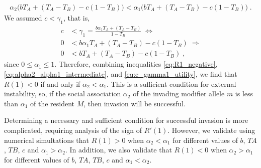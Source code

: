 \documentclass[12pt]{extarticle}
\begin{document}
\begin{appendices}
\begin{equation}
\begin{aligned}
\alpha_2 \big(b T_{A} + (T_A-T_B) - c(1-T_B)\big) <
\alpha_1 \big(b T_{A} + (T_A-T_B) - c(1-T_B)\big) \;.
\end{aligned}
\end{equation}
We assumed $c<\gamma_1$, that is,
\begin{equation} \label{eq:c_gamma1_utility}
\begin{aligned}
c &< \gamma_1 = \frac{b \alpha_1 T_A + (T_A-T_B)}{1-T_B} \; \Leftrightarrow \\
0 &< b \alpha_1 T_A + (T_A-T_B) - c(1-T_B) \; \Rightarrow \\
0 &< b T_A + (T_A-T_B) - c(1-T_B) \;,
\end{aligned}
\end{equation}
since $0 \le \alpha_1 \le 1$.
Therefore, combining inequalities \ref{eq:R1_negative}, \ref{eq:alpha2_alpha1_intermediate}, and \ref{eq:c_gamma1_utility}, we find that $R(1)<0$ if and only if $\alpha_2 < \alpha_1$. This is a sufficient condition for external instability, so, if the social association $\alpha_2$ of the invading modifier allele $m$ is less than $\alpha_1$ of the resident $M$, then invasion will be successful.

Determining a necessary and sufficient condition for successful invasion is more complicated, requiring analysis of the sign of $R'(1)$.
However, we validate using numerical simultations that $R(1)>0$ when $\alpha_2<\alpha_1$ for different values of $b$, $TA$, $TB$, $c$ and $\alpha_1>\alpha_2$.
In addition, we also validate that $R(1)<0$ when $\alpha_2 > \alpha_1$ for different values of $b$, $TA$, $TB$, $c$ and $\alpha_1<\alpha_2$.

  
  
  
\end{appendices}
\end{document}
